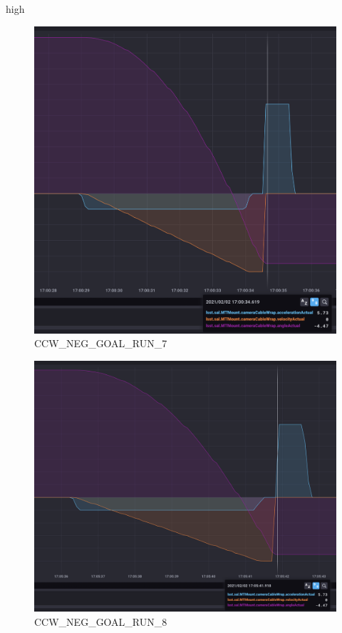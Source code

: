 high\documentclass[SE,lsstdraft,authoryear,toc]{lsstdoc}
\begin{document}
\begin{figure}[h!]
  \includegraphics[width=\linewidth]{media/CCW_high_speed_neg_test7.png}
  \caption{CCW\_NEG\_GOAL\_RUN\_7}
  \label{fig:CCW_NEG_GOAL_RUN_7}
\end{figure}
\begin{figure}[h!]
  \includegraphics[width=\linewidth]{media/CCW_high_speed_neg_test8.png}
  \caption{CCW\_NEG\_GOAL\_RUN\_8}
  \label{fig:CCW_NEG_GOAL_RUN_8}
\end{figure}
\end{document}
